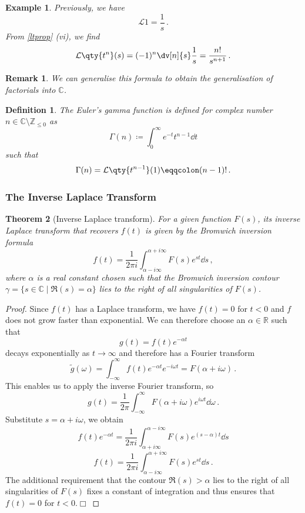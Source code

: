 \documentclass{article}
\theoremstyle{plain}\theoremheaderfont{\normalfont\itshape}\theorembodyfont{\rmfamily}\theoremseparator{.}\newtheorem*{rem}{Remark}\newtheorem*{ex}{Example}\newtheorem*{proof}{Proof}\newtheorem*{altp}{Alternative proof}
\theoremstyle{plain}\theoremheaderfont{\normalfont\bfseries}\theorembodyfont{\rmfamily}\theoremseparator{.}\newtheorem{thm}{Theorem}[section]\newtheorem{lem}[thm]{Lemma}\newtheorem{prop}[thm]{Proposition}\newtheorem*{cor}{Corollary}\newtheorem{defn}[thm]{Definition}\newtheorem{clm}[thm]{Claim}\newtheorem{clminproof}{Claim}
\theoremstyle{break}\theoremheaderfont{\normalfont\itshape}\theorembodyfont{\rmfamily}\theoremseparator{.\medskip}\newtheorem*{proofskip}{Proof}\newtheorem*{exs}{Examples}\newtheorem*{rems}{Remarks}
\theoremstyle{break}\theoremheaderfont{\normalfont\bfseries}\theorembodyfont{\rmfamily}\theoremseparator{.\medskip}\newtheorem{lemskip}[thm]{Lemma}\newtheorem{defnskip}[thm]{Definition}\newtheorem{propskip}[thm]{Proposition}\newtheorem{thmskip}[thm]{Theorem}
\numberwithin{equation}{section}
\newcommand{\qed}{\hfill\ensuremath{\Box}}
\newcommand{\lt}[1]{\mathcal{L}\qty{ #1 }}
\begin{document}
	\begin{ex}
		Previously, we have
		\[\lt{1}=\frac{1}{s}\,.\]
		From \cref{ltprop} (vi), we find
		\[\lt{t^n}(s)=(-1)^n\dv[n]{s}\frac{1}{s}=\frac{n!}{s^{n+1}}\,.\]
	\end{ex}
	\begin{rem}
		We can generalise this formula to obtain the generalisation of factorials into \(\mathbb{C}\).
	\end{rem}
	\begin{defn}
		The \textit{Euler's gamma function} is defined for complex number \(n\in\mathbb{C}\setminus\mathbb{Z}_{\le 0}\) as
		\[\Gamma(n)\coloneqq \int_{0}^{\infty}e^{-t}t^{n-1}\dd{t}\]
		such that
		\[\Gamma(n)=\lt{t^{n-1}}(1)\eqqcolon(n-1)!\,.\]
	\end{defn}
	\subsubsection{The Inverse Laplace Transform}
	\begin{thm}[Inverse Laplace transform]
		For a given function \(F(s)\), its inverse Laplace transform that recovers \(f(t)\) is given by the \textit{Bromwich inversion formula}
		\[f(t)=\frac{1}{2\pi i}\int_{\alpha-i\infty}^{\alpha+i\infty}F(s)e^{st}\dd{s}\,,\]
		where \(\alpha\) is a real constant chosen such that the \textit{Bromwich inversion contour} \(\gamma=\{s\in\mathbb{C}\mid \Re(s)=\alpha\}\) lies to the right of all singularities of \(F(s)\).
	\end{thm}
	\begin{proof}
		Since \(f(t)\) has a Laplace transform, we have \(f(t)=0\) for \(t<0\) and \(f\) does not grow faster than exponential. We can therefore choose an \(\alpha\in\mathbb{R}\) such that
		\[g(t)=f(t)e^{-\alpha t}\]
		decays exponentially as \(t\to\infty\) and therefore has a Fourier transform
		\[\tilde{g}(\omega)=\int_{-\infty}^{\infty}f(t)e^{-\alpha t}e^{-i\omega t}=F(\alpha+i\omega)\,.\]
		This enables us to apply the inverse Fourier transform, so
		\[g(t)=\frac{1}{2\pi}\int_{-\infty}^{\infty}F(\alpha+i\omega)e^{i\omega t}\dd{\omega}\,.\]
		Substitute \(s=\alpha+i\omega\), we obtain
		\[f(t)e^{-\alpha t}=\frac{1}{2\pi i}\int_{\alpha+i\infty}^{\alpha-i\infty}F(s)e^{(s-\alpha)t}\dd{s}\]
		\[f(t)=\frac{1}{2\pi i}\int_{\alpha-i\infty}^{\alpha+i\infty}F(s)e^{st}\dd{s}\,.\]
		The additional requirement that the contour \(\Re(s)>\alpha\) lies to the right of all singularities of \(F(s)\) fixes a constant of integration and thus ensures that \(f(t)=0\) for \(t<0\).\qed
	\end{proof}
\end{document}
